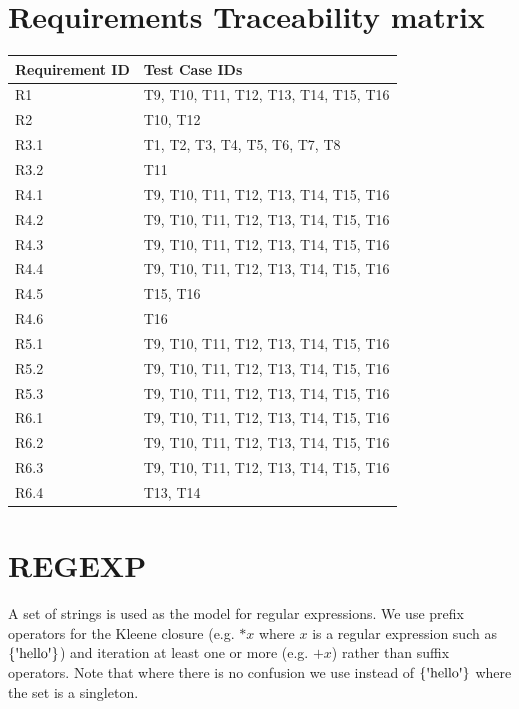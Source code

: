 \documentclass[runningheads,12pt]{article}
\begin{document}
\section{Requirements Traceability matrix}

\begin{tabular}{|p{1.5in}|p{3.5in}|}
\hline
\textbf{Requirement ID}	 & \textbf{Test Case IDs}\\ 
\hline
R1 & T9, T10, T11, T12, T13, T14, T15, T16\\
\hline
R2 & T10, T12\\
\hline
R3.1 & T1, T2, T3, T4, T5, T6, T7, T8\\
\hline
R3.2 & T11\\
\hline
R4.1 & T9, T10, T11, T12, T13, T14, T15, T16\\
\hline
R4.2 & T9, T10, T11, T12, T13, T14, T15, T16\\
\hline
R4.3 & T9, T10, T11, T12, T13, T14, T15, T16\\
\hline
R4.4 & T9, T10, T11, T12, T13, T14, T15, T16\\
\hline
R4.5 & T15, T16\\
\hline
R4.6 & T16\\
\hline
R5.1 & T9, T10, T11, T12, T13, T14, T15, T16\\
\hline
R5.2 & T9, T10, T11, T12, T13, T14, T15, T16\\
\hline
R5.3 & T9, T10, T11, T12, T13, T14, T15, T16\\
\hline
R6.1 & T9, T10, T11, T12, T13, T14, T15, T16\\
\hline
R6.2 & T9, T10, T11, T12, T13, T14, T15, T16\\
\hline
R6.3 & T9, T10, T11, T12, T13, T14, T15, T16\\
\hline
R6.4 & T13, T14\\
\hline
\end{tabular}




\newpage
\appendix

\section{REGEXP}


A set of strings is used as the model for regular expressions. We use prefix operators for the Kleene closure (e.g. $*x$ where $x$ is a regular expression such as $\{\squote{hello}\}$) and iteration at least one or more (e.g. $\textrm{+}x$) rather than suffix operators. Note that where there is no confusion we use  instead of $\{\squote{hello}\}$ where the set is a singleton. 
\end{document}
